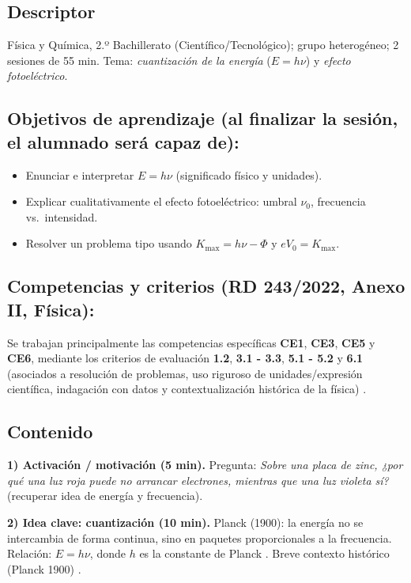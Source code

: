\documentclass[11pt,a4paper]{article}
\begin{document}
\onehalfspacing

\subsection*{Descriptor}
Física y Química, 2.º Bachillerato (Científico/Tecnológico); grupo heterogéneo; 2 sesiones de 55 min. Tema: \textit{cuantización de la energía} ($E=h\nu$) y \textit{efecto fotoeléctrico}.
\subsection*{Objetivos de aprendizaje (al finalizar la sesión, el alumnado será capaz de):}
\begin{itemize}
  \item Enunciar e interpretar $E=h\nu$ (significado físico y unidades).
  \item Explicar cualitativamente el efecto fotoeléctrico: umbral $\nu_0$, frecuencia vs.\ intensidad.
  \item Resolver un problema tipo usando $K_{\max}=h\nu-\Phi$ y $eV_0=K_{\max}$.
\end{itemize}

\subsection*{Competencias y criterios (RD 243/2022, Anexo II, Física):}
Se trabajan principalmente las competencias específicas \textbf{CE1}, \textbf{CE3}, \textbf{CE5} y \textbf{CE6},
mediante los criterios de evaluación \textbf{1.2}, \textbf{3.1 - 3.3}, \textbf{5.1 - 5.2} y \textbf{6.1}
(asociados a resolución de problemas, uso riguroso de unidades/expresión científica, indagación con datos y
contextualización histórica de la física) \cite[págs.~143 - 144]{BOE_RD243_2022}. 

\subsection*{Contenido}
\textbf{1) Activación / motivación (5 min).} Pregunta: \emph{Sobre una placa de zinc, ¿por qué una luz roja puede no arrancar electrones, mientras que una luz violeta sí?} (recuperar idea de energía y frecuencia).

\textbf{2) Idea clave: cuantización (10 min).} Planck (1900): la energía no se intercambia de forma continua, sino en paquetes proporcionales a la frecuencia. Relación: $E = h\nu$, donde $h$ es la constante de Planck \cite{NIST_MeetConstants}. Breve contexto histórico (Planck 1900) \cite{MPG_PlanckPackets}.
\end{document}
